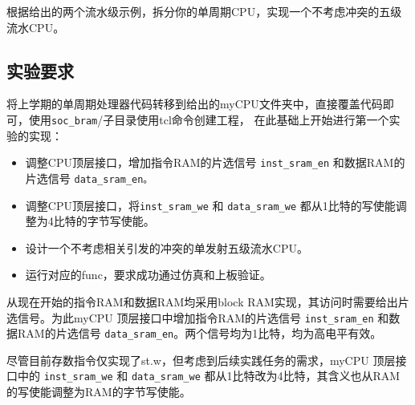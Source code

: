 根据给出的两个流水级示例，拆分你的单周期CPU，实现一个不考虑冲突的五级流水CPU。


\subsection{实验要求}


将上学期的单周期处理器代码转移到给出的myCPU文件夹中，直接覆盖代码即可，使用\texttt{soc\_bram}/子目录使用tcl命令创建工程，
在此基础上开始进行第一个实验的实现：
\begin{itemize}
    \item 调整CPU顶层接口，增加指令RAM的片选信号 \texttt{inst\_sram\_en} 和数据RAM的片选信号 \texttt{data\_sram\_en。}
    \item 调整CPU顶层接口，将\texttt{inst\_sram\_we} 和 \texttt{data\_sram\_we} 都从1比特的写使能调整为4比特的字节写使能。
    \item 设计一个不考虑相关引发的冲突的单发射五级流水CPU。
    \item 运行对应的func，要求成功通过仿真和上板验证。
\end{itemize}

从现在开始的指令RAM和数据RAM均采用block RAM实现，其访问时需要给出片选信号。为此myCPU 顶层接口中增加指令RAM的片选信号 \texttt{inst\_sram\_en} 和数据RAM的片选信号 \texttt{data\_sram\_en}。两个信号均为1比特，均为高电平有效。

尽管目前存数指令仅实现了st.w，但考虑到后续实践任务的需求，myCPU 顶层接口中的 \texttt{inst\_sram\_we} 和 \texttt{data\_sram\_we} 都从1比特改为4比特，其含义也从RAM的写使能调整为RAM的字节写使能。


